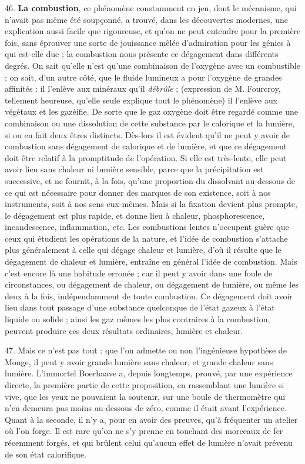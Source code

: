 \documentclass[a4paper, 11pt, oneside, polutonikogreek, french]{article}
\begin{document}
46. \textbf{La combustion}, ce phénomène constamment en jeu, dont le mécanisme, qui n'avait pas même été soupçonné, a trouvé, dans les découvertes modernes, une explication aussi facile que rigoureuse, et qu'on ne peut entendre pour la première fois, sans éprouver une sorte de jouissance mêlée d'admiration pour les génies à qui est-elle due ; la combustion nous présente ce dégagement dans différents degrés. On sait qu'elle n'est qu'une combinaison de l'oxygène avec un combustible ; on sait, d'un autre côté, que le fluide lumineux a pour l'oxygène de grandes affinités : il l'enlève aux minéraux qu'il \emph{débrûle} ; (expression de M. Fourcroy, tellement heureuse, qu'elle seule explique tout le phénomène) il l'enlève aux végétaux et les gazéifie. De sorte que le gaz oxygène doit être regardé comme une combinaison ou une dissolution de cette substance par le calorique et la lumière, si on en fait deux êtres distincts. Dès-lors il est évident qu'il ne peut y avoir de combustion sans dégagement de calorique et de lumière, et que ce dégagement doit être relatif à la promptitude de l'opération. Si elle est très-lente, elle peut avoir lieu sans chaleur ni lumière sensible, parce que la précipitation est successive, et ne fournit, à la fois, qu'une proportion du dissolvant au-dessous de ce qui est nécessaire pour donner des marques de son existence, soit à nos instruments, soit à nos sens eux-mêmes. Mais si la fixation devient plus prompte, le dégagement est plus rapide, et donne lieu à chaleur, phosphorescence, incandescence, inflammation, \emph{etc.} Les combustions lentes n'occupent guère que ceux qui étudient les opérations de la nature, et l'idée de combustion s'attache plus généralement à celle qui dégage chaleur et lumière, d'où il résulte que le dégagement de chaleur et lumière, entraîne en général l'idée de combustion. Mais c'est encore là une habitude erronée ; car il peut y avoir dans une foule de circonstances, ou dégagement de chaleur, ou dégagement de lumière, ou même les deux à la fois, indépendamment de toute combustion. Ce dégagement doit avoir lieu dans tout passage d'une substance quelconque de l'état gazeux à l'état liquide ou solide ; ainsi les gaz mêmes les plus contraires à la combustion, peuvent produire ces deux résultats ordinaires, lumière et chaleur.

47. Mais ce n'est pas tout : que l'on admette ou non l'ingénieuse hypothèse de Monge, il peut y avoir grande lumière sans chaleur, et grande chaleur sans lumière. L'immortel Boerhaave a, depuis longtemps, prouvé, par une expérience directe, la première partie de cette proposition, en rassemblant une lumière si vive, que les yeux ne pouvaient la soutenir, sur une boule de thermomètre qui n'en demeura pas moins au-dessous de zéro, comme il était avant l'expérience. Quant à la seconde, il n'y a, pour en avoir des preuves, qu'à fréquenter un atelier où l'on forge. Il est rare qu'on ne s'y prenne en touchant des morceaux de fer récemment forgés, et qui brûlent celui qu'aucun effet de lumière n'avait prévenu de son état calorifique.
\end{document}
